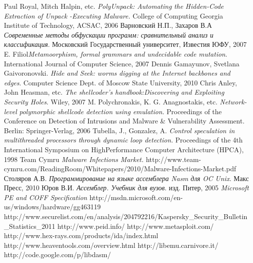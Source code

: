 \documentclass[oneside, final, 14pt]{extreport}
\begin{document}
\begin{thebibliography}{00}
 Paul Royal, Mitch Halpin, etc. \emph{ PolyUnpack: Automating the Hidden-Code Extraction of Unpack -Executing Malware.} College of Computing Georgia Institute of Technology, ACSAC, 2006
 Варновский Н.П., Захаров В.А \emph{Современные методы обфускации программ: сравнительный анализ и классификация}. Московский Государственный университет, Известия ЮФУ, 2007 
 E. Filiol\emph{Metamoorphism, formal grammars and undecidable code mutation}. International Journal of Computer Science, 2007
 Dennis Gamayunov, Svetlana Gaivoronovski. \emph{Hide and Seek:  worms digging at the Internet backbones and edges}. Computer Science Dept. of Moscow State University, 2010
 Chris Anley, John Heasman, etc. \emph{The shellcoder's handbook:Discovering and Exploiting Security Holes}. Wiley, 2007
 M. Polychronakis, K. G. Anagnostakis, etc. \emph{Network-level polymorphic shellcode detection using emulation.} Proceedings of the Conference on Detection of Intrusions and Malware \& Vulnerability Assessment. Berlin: Springer-Verlag, 2006
 Tubella, J., Gonzalez, A. \emph{Control speculation in multithreaded processors through dynamic loop detection.} Proceedings of the 4th International Symposium on HighPerformance Computer Architecture (HPCA), 1998
 Team Cymru \emph{Malware Infections Market.} http://www.team-cymru.com/ReadingRoom/Whitepapers/2010/Malware-Infections-Market.pdf
 Столяров А.В. \emph{Программирование на языке ассемблера Nasm для OC Unix}. Макс Пресс, 2010
 Юров В.И. \emph{ Ассемблер. Учебник для вузов}. изд. Питер, 2005
 \emph{Microsoft  PE and COFF Specification}  http://msdn.microsoft.com/en-us/windows/hardware/gg463119
 http://www.securelist.com/en/analysis/204792216/Kaspersky\_Security\_Bulletin\_Statistics\_2011
 http://www.peid.info/
 http://www.metasploit.com/
 http://www.hex-rays.com/products/ida/index.html
 http://www.heaventools.com/overview.html 
 http://libemu.carnivore.it/
 http://code.google.com/p/libdasm/
\end{thebibliography}
\end{document}
